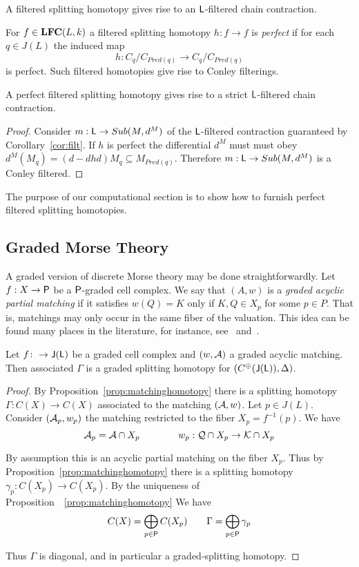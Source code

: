 \begin{cor}\label{cor:filt}
A filtered splitting homotopy gives rise to an ${\mathsf L}$-filtered chain contraction.
\end{cor}

For $f\in {\bf LFC}(L,k)$ a filtered splitting homotopy $h:f\to f$ is {\em perfect} if for each $q\in J(L)$ the induced map $$h:C_q/C_{Pred(q)}\to C_q/C_{Pred(q)}$$ is perfect.  Such filtered homotopies give rise to Conley filterings.

\begin{cor}
A perfect filtered splitting homotopy gives rise to a strict ${\mathsf L}$-filtered chain contraction.
\end{cor}
\begin{proof}
 Consider $m:{\mathsf L}\to Sub(M,d^M)$ of the ${\mathsf L}$-filtered contraction guaranteed by Corollary~\ref{cor:filt}.  If $h$ is perfect the differential $d^M$ must must obey $d^M(M_q) = (d-dhd)M_q\subseteq M_{Pred(q)}$.  Therefore $m:{\mathsf L}\to Sub(M,d^M)$ is a Conley filtered.
\end{proof}

The purpose of our computational section is to show how to furnish perfect filtered splitting homotopies.  



\subsection{Graded Morse Theory}

A graded version of discrete Morse theory may be done straightforwardly.   Let $f:X\to {\mathsf P}$ be a ${\mathsf P}$-graded cell complex.  We say that $(A,w)$ is a {\em graded acyclic partial matching} if it satisfies $w(Q)=K$ only if $K,Q\in X_p$ for some $p\in P$.  That is, matchings may only occur in the same fiber of the valuation.  This idea can be found many places in the literature, for instance, see~\cite{mn} and~\cite[Patchwork Theorem]{koz}.

\begin{prop}
Let $f\colon \to {\mathsf J}({\mathsf L})$ be a graded cell complex and $(w,{\mathcal A})$ a graded acyclic matching.  Then associated $\Gamma$ is a graded splitting homotopy for $(C^\oplus({\mathsf J}({\mathsf L})),\Delta)$.  
\end{prop}
\begin{proof}
By Proposition~\ref{prop:matchinghomotopy} there is a splitting homotopy $\Gamma:C(X)\to C(X)$ associated to the matching $({\mathcal A},w)$.  Let $p\in J(L)$.  Consider $({\mathcal A}_p,w_p)$ the matching restricted to the fiber $X_p = f^{-1}(p)$.  We have $${\mathcal A}_p = {\mathcal A}\cap X_p\quad\quad \quad \quad  w_p:{\mathcal Q}\cap X_p\to {\mathcal K}\cap X_p$$

By assumption this is an acyclic partial matching on the fiber $X_p$.  Thus by Proposition~\ref{prop:matchinghomotopy} there is a splitting homotopy $\gamma_p:C(X_p)\to C(X_p)$.    By the uniqueness of Proposition~~\ref{prop:matchinghomotopy} We have $$C(X) = \bigoplus_{p\in {\mathsf P}} C(X_p) \quad\quad \Gamma = \bigoplus_{p\in {\mathsf P}} \gamma_p$$ 

Thus $\Gamma$ is diagonal, and in particular a graded-splitting homotopy.

\end{proof}

